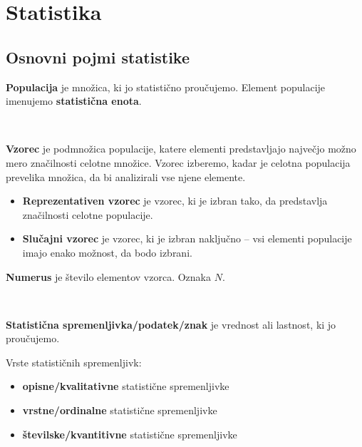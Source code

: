 \chapter{Statistika}




    \section{Osnovni pojmi statistike}

        

            
                \textbf{Populacija} je množica, ki jo statistično proučujemo. 
                Element populacije imenujemo \textbf{statistična enota}. 
            
                ~
            
                \textbf{Vzorec} je podmnožica populacije, katere elementi predstavljajo največjo možno mero značilnosti celotne množice. 
                Vzorec izberemo, kadar je celotna populacija prevelika množica, da bi analizirali vse njene elemente. 
                
                \begin{itemize}
                    \item \textbf{Reprezentativen vzorec} je vzorec, ki je izbran tako, da predstavlja značilnosti celotne populacije.
                    \item \textbf{Slučajni vzorec} je vzorec, ki je izbran naključno -- vsi elementi populacije imajo enako možnost, da bodo izbrani.
                \end{itemize}

                \textbf{Numerus} je število elementov vzorca. Oznaka $N$. 
            
                ~
            
                \textbf{Statistična spremenljivka/podatek/znak} je vrednost ali lastnost, ki jo proučujemo.
            

                Vrste statističnih spremenljivk:
                \begin{itemize}
                    \item \textbf{opisne/kvalitativne} statistične spremenljivke
                    \item \textbf{vrstne/ordinalne} statistične spremenljivke
                    \item \textbf{številske/kvantitivne} statistične spremenljivke
                \end{itemize}
                
